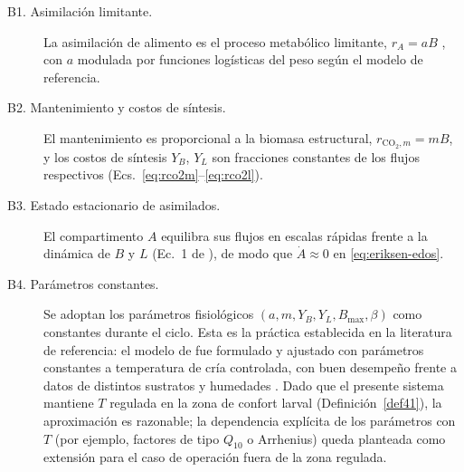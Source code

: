 \begin{description}
\item[B1. Asimilación limitante.] La asimilación de alimento es el proceso
metabólico limitante, $r_A = aB$ \citep{eriksenDynamicModellingFeed2022}, con $a$ modulada por
funciones logísticas del peso según el modelo de referencia.

\item[B2. Mantenimiento y costos de síntesis.] El mantenimiento es
proporcional a la biomasa estructural, $r_{\mathrm{CO_2},m} = mB$, y los
costos de síntesis $Y_B$, $Y_L$ son fracciones constantes de los flujos
respectivos (Ecs.~\eqref{eq:rco2m}--\eqref{eq:rco2l}).

\item[B3. Estado estacionario de asimilados.] El compartimento $A$
equilibra sus flujos en escalas rápidas frente a la dinámica de $B$ y $L$
(Ec.~1 de \citet{eriksenDynamicModellingFeed2022}), de modo que $\dot{A} \approx 0$ en
\eqref{eq:eriksen-edos}.

\item[B4. Parámetros constantes.] Se adoptan los parámetros fisiológicos
$(a, m, Y_B, Y_L, B_{\max}, \beta)$ como constantes durante el ciclo. Esta
es la práctica establecida en la literatura de referencia: el modelo de
\citet{eriksenDynamicModellingFeed2022} fue formulado y ajustado con parámetros constantes a
temperatura de cría controlada, con buen desempeño frente a datos de
distintos sustratos y humedades \citep{eriksenDynamicModellingFeed2022,eriksenMetabolicPerformanceFeed2024}. Dado que
el presente sistema mantiene $T$ regulada en la zona de confort larval
(Definición~\ref{def41}), la aproximación es razonable; la dependencia
explícita de los parámetros con $T$ (por ejemplo, factores de tipo
$Q_{10}$ o Arrhenius) queda planteada como extensión para el caso de
operación fuera de la zona regulada.
\end{description}